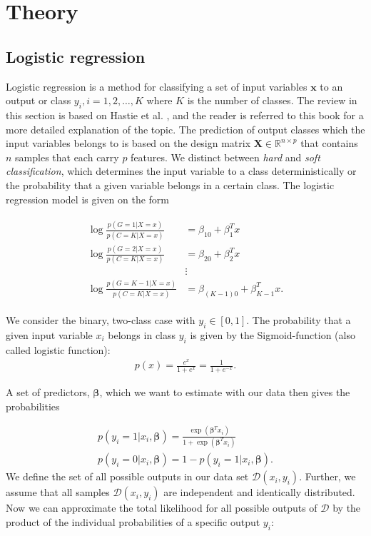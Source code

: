 \documentclass[../main.tex]{subfiles}
\begin{document}
\section{Theory}
\subsection{Logistic regression}
Logistic regression is a method for classifying a set of input variables \ensuremath{\boldsymbol{x}} to an output or class \ensuremath{y_i, i=1,2, \ldots,K} where $K$ is the number of classes. The review in this section is based on Hastie et al. \cite[ch.~4]{HastieTrevor2009EoSL},  and the reader is referred to this book for a more detailed explanation of the topic. The prediction of output classes which the input variables belongs to is based on the design matrix \ensuremath{\boldsymbol{X}\in\mathbb{R}^{n\times p}} that contains $n$ samples that each carry $p$ features. We distinct between \textit{hard} and \textit{soft classification}, which determines the input variable to a class deterministically or the probability that a given variable belongs in a certain class. The logistic regression model is given on the form
 
\begin{align}
    \begin{split}
        \log\frac{p(G=1|X=x)}{p(C=K|X=x)}&=\beta_{10}+\beta_1^Tx \\
        \log\frac{p(G=2|X=x)}{p(C=K|X=x)}&=\beta_{20}+\beta_2^Tx \\
        &\vdots\\ 
        \log\frac{p(G=K-1|X=x)}{p(C=K|X=x)}&=\beta_{(K-1)0}+\beta_{K-1}^Tx.
    \end{split}
\end{align}

We consider the binary, two-class case with \ensuremath{y_i \in [0,1]}. The probability that a given input variable $x_i$ belongs in class $y_i$ is given by the Sigmoid-function (also called logistic function):
\begin{align}
    p(x) = \frac{e^x}{1+e^x}=\frac{1}{1+e^{-x}}.
    \label{eq:sigmoid}
\end{align}

A set of predictors, \ensuremath{\boldsymbol{\beta}}, which we want to estimate with our data then gives the probabilities 

\begin{align}
    p(y_i=1|x_i,\boldsymbol{\beta})=\frac{\exp\left(\boldsymbol{\beta}^Tx_i\right)}{1+\exp\left(\boldsymbol{\beta}^Tx_i\right)} \\
    p(y_i=0|x_i,\boldsymbol{\beta})=1-p(y_i=1|x_i,\boldsymbol{\beta}).
\end{align} We define the set of all possible outputs in our data set \ensuremath{\mathcal{D}(x_i,y_i)}. Further, we assume that all samples \ensuremath{\mathcal{D}(x_i,y_i)} are independent and identically distributed. Now we can approximate the total likelihood for all possible outputs of \ensuremath{\mathcal{D}} by the product of the individual probabilities \cite[p.~120]{HastieTrevor2009EoSL} of a specific output $y_i$:
\end{document}
